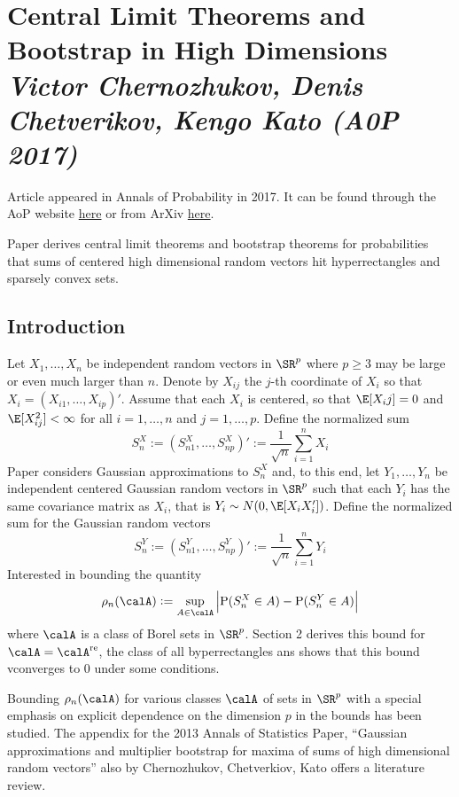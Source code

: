 
\section{Central Limit Theorems and Bootstrap in High Dimensions \textit{\small Victor Chernozhukov, Denis Chetverikov, Kengo Kato (A0P 2017)}}

Article appeared in Annals of Probability in 2017. It can be found through the AoP website \href{https://projecteuclid.org/euclid.aop/1502438428}{here} or from ArXiv \href{https://arxiv.org/pdf/1412.3661.pdf}{here}.

Paper derives central limit theorems and bootstrap theorems for probabilities that sums of centered high dimensional random vectors hit hyperrectangles and sparsely convex sets. 

\subsection{Introduction}

Let $X_1, \dots, X_n$ be independent random vectors in $\SR^p$ where $p\geq 3$ may be large or even much larger than $n$. Denote by $X_{ij}$ the $j$-th coordinate of $X_i$ so that $X_i = (X_{i1},\dots,X_{ip})'$. Assume that each $X_i$ is centered, so that $\E[X_ij] = 0$ and $\E[X_{ij}^2] < \infty$ for all $i = 1, \dots, n$ and $j = 1, \dots, p$. Define the normalized sum 
\[S_n^X := \left(S_{n1}^X, \dots, S_{np}^X\right)' := \frac{1}{\sqrt{n}} \sum_{i=1}^n X_i\]
Paper considers Gaussian approximations to $S_n^X$ and, to this end, let $Y_1, \dots, Y_n$ be independent centered Gaussian random vectors in $\SR^p$ such that each $Y_i$ has the same covariance matrix as $X_i$, that is $Y_i \sim N(0,\E[X_iX_i'])$. Define the normalized sum for the Gaussian random vectors 
\[S_n^Y := \left(S_{n1}^Y, \dots, S_{np}^Y\right)' := \frac{1}{\sqrt{n}}\sum_{i=1}^n Y_i\]
Interested in bounding the quantity 
\begin{equation}
	\label{eq:cck17-1}
	\rho_n(\calA) := \sup_{A\in \calA}\left| \P(S_n^X \in A) - \P(S_n^Y\in A)\right|
\end{equation}
where $\calA$ is a class of Borel sets in $\SR^p$. Section 2 derives this bound for $\calA = \calA^{\text{re}}$, the class of all byperrectangles ans shows that this bound vconverges to 0 under some conditions. 

Bounding $\rho_n(\calA)$ for various classes $\calA$ of sets in $\SR^p$ with a special emphasis on explicit dependence on the dimension $p$ in the bounds has been studied. The appendix for the 2013 Annals of Statistics Paper, ``Gaussian approximations and multiplier bootstrap for maxima of sums of high dimensional random vectors'' also by Chernozhukov, Chetverkiov, Kato offers a literature review. 

